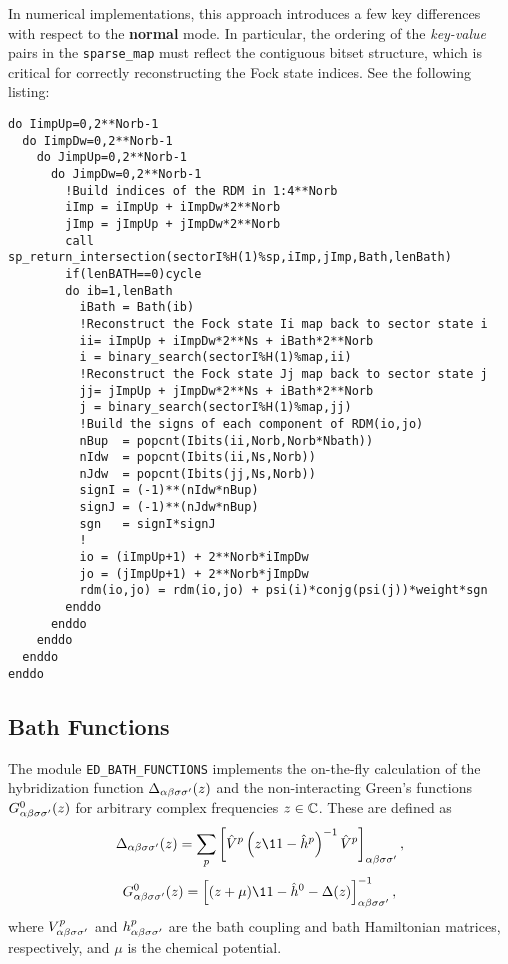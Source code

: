 \documentclass[edipack_sp.tex]{subfiles}
\begin{document}
  
In numerical implementations, this approach introduces a few 
key differences with respect to the {\bf normal} mode.
In particular, the 
ordering of the \emph{key-value} pairs in the {\tt sparse\_map} 
must reflect the contiguous bitset structure, which is critical 
for correctly reconstructing the Fock state indices.
See the following listing:
\begin{lstlisting}[style=fstyle,numbers=none,basicstyle={\scriptsize\ttfamily}]
do IimpUp=0,2**Norb-1
  do IimpDw=0,2**Norb-1
    do JimpUp=0,2**Norb-1
      do JimpDw=0,2**Norb-1
        !Build indices of the RDM in 1:4**Norb
        iImp = iImpUp + iImpDw*2**Norb
        jImp = jImpUp + jImpDw*2**Norb
        call sp_return_intersection(sectorI%H(1)%sp,iImp,jImp,Bath,lenBath)
        if(lenBATH==0)cycle
        do ib=1,lenBath
          iBath = Bath(ib)
          !Reconstruct the Fock state Ii map back to sector state i
          ii= iImpUp + iImpDw*2**Ns + iBath*2**Norb
          i = binary_search(sectorI%H(1)%map,ii)
          !Reconstruct the Fock state Jj map back to sector state j
          jj= jImpUp + jImpDw*2**Ns + iBath*2**Norb
          j = binary_search(sectorI%H(1)%map,jj)
          !Build the signs of each component of RDM(io,jo)
          nBup  = popcnt(Ibits(ii,Norb,Norb*Nbath))
          nIdw  = popcnt(Ibits(ii,Ns,Norb))
          nJdw  = popcnt(Ibits(jj,Ns,Norb))
          signI = (-1)**(nIdw*nBup)
          signJ = (-1)**(nJdw*nBup)
          sgn   = signI*signJ
          !  
          io = (iImpUp+1) + 2**Norb*iImpDw
          jo = (jImpUp+1) + 2**Norb*jImpDw
          rdm(io,jo) = rdm(io,jo) + psi(i)*conjg(psi(j))*weight*sgn
        enddo
      enddo
    enddo
  enddo
enddo
\end{lstlisting}


\subsection{Bath Functions}\label{sSecFunc}
The module {\tt ED\_BATH\_FUNCTIONS} implements the on-the-fly 
calculation of the hybridization function 
$\Delta_{\alpha\beta\sigma\sigma'}(z)$ and the non-interacting Green's functions 
$G^0_{\alpha\beta\sigma\sigma'}(z)$ for arbitrary complex frequencies $z \in \mathbb{C}$. 
These are defined as
\begin{equation}
\Delta_{\a\b\s\s'}(z) = \sum_p \left[\hat{V}^p
\left( z\11 - \hat{h}^p \right)^{-1} \hat{V}^p\right]_{\a\b\s\s'},
\end{equation}
\begin{equation}
G^0_{\a\b\s\s'}(z) = 
\left[ (z + \mu)\11 - \hat{h}^0 - 
\Delta(z) \right]_{\a\b\s\s'}^{-1},
\end{equation}
where $V^p_{\alpha\beta\sigma\sigma'}$ and $h^p_{\alpha\beta\sigma\sigma'}$ are the bath coupling 
and bath Hamiltonian matrices, respectively, and $\mu$ is the chemical 
potential.
\end{document}
